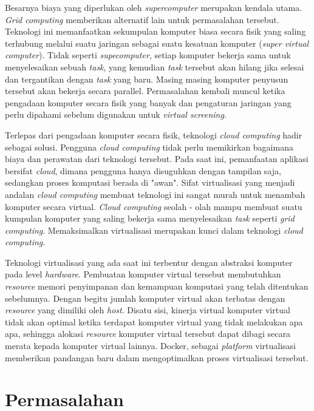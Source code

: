 Besarnya biaya yang diperlukan oleh \textit{supercomputer} merupakan kendala utama. \textit{Grid computing} memberikan alternatif lain untuk permasalahan tersebut. Teknologi ini memanfaatkan sekumpulan komputer biasa secara fisik yang saling terhubung melalui suatu jaringan sebagai suatu kesatuan komputer (\textit{super virtual computer}). Tidak seperti \textit{supecomputer}, setiap komputer bekerja sama untuk menyelesaikan sebuah \textit{task}, yang kemudian \textit{task} tersebut akan hilang jika selesai dan tergantikan dengan \textit{task} yang baru. Masing masing komputer penyusun tersebut akan bekerja secara parallel. Permasalahan kembali muncul ketika pengadaan komputer secara fisik yang banyak dan pengaturan jaringan yang perlu dipahami sebelum digunakan untuk \textit{virtual screening}.

Terlepas dari pengadaan komputer secara fisik, teknologi \textit{cloud computing} hadir sebagai solusi. Pengguna \textit{cloud computing} tidak perlu memikirkan bagaimana biaya dan perawatan dari teknologi tersebut. Pada saat ini, pemanfaatan aplikasi bersifat \textit{cloud}, dimana pengguna hanya disuguhkan dengan tampilan saja, sedangkan proses komputasi berada di "awan". Sifat virtualisasi yang menjadi andalan \textit{cloud computing} membuat teknologi ini sangat murah untuk menambah komputer secara virtual. \textit{Cloud computing} seolah - olah mampu membuat suatu kumpulan komputer yang saling bekerja sama menyelesaikan \textit{task} seperti \textit{grid computing}. Memaksimalkan virtualisasi merupakan kunci dalam teknologi \textit{cloud computing}.

Teknologi virtualisasi yang ada saat ini terbentur dengan abstraksi komputer pada level \textit{hardware}. Pembuatan komputer virtual tersebut membutuhkan \textit{resource} memori penyimpanan dan kemampuan komputasi yang telah ditentukan sebelumnya. Dengan begitu jumlah komputer virtual akan terbatas dengan \textit{resource} yang dimiliki oleh \textit{host}. Disatu sisi, kinerja virtual komputer virtual tidak akan optimal ketika terdapat komputer virtual yang tidak melakukan apa apa, sehingga alokasi \textit{resource} komputer virtual tersebut dapat dibagi secara merata kepada komputer virtual lainnya. Docker, sebagai \textit{platform} virtualisasi memberikan  pandangan baru dalam mengoptimalkan proses virtualisasi tersebut.  

\section{Permasalahan}
